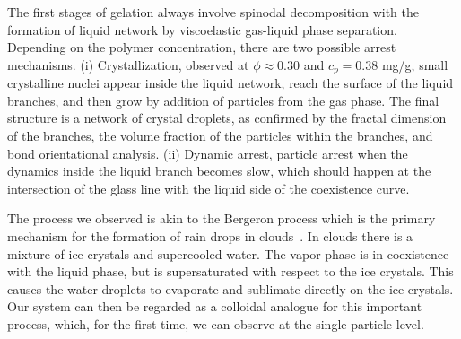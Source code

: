 \documentclass[12pt]{article}
\begin{document}
The first stages of gelation always involve spinodal decomposition with the formation
of liquid network by viscoelastic gas-liquid phase separation. 
Depending on the polymer concentration, there are two possible arrest mechanisms. 
(i) Crystallization, observed at $\phi\approx 0.30$ and $c_p=0.38$ mg/g, small crystalline nuclei appear inside the liquid network, reach the surface 
 of the liquid branches, and then grow by addition of particles from the gas phase. The final structure is a network of crystal droplets,
 as confirmed by the fractal dimension of the branches, the volume fraction of the particles within the branches, and bond orientational analysis. 
(ii) Dynamic arrest, particle arrest when the dynamics inside the liquid branch becomes slow, which should happen at the intersection of the
 glass line with the liquid side of the coexistence curve. 

The process we observed is akin to the Bergeron process which is the primary mechanism for the formation of rain drops in clouds~\cite{glickman2000glossary,morrison2012resilience}.
In clouds there is a mixture of ice crystals and supercooled water. The vapor phase is in coexistence with the liquid phase, but is supersaturated
with respect to the ice crystals. This causes the water droplets to evaporate and sublimate directly on the ice crystals. Our system can then
be regarded as a colloidal analogue for this important process, which, for the first time, we can observe at the single-particle level.  
\end{document}
